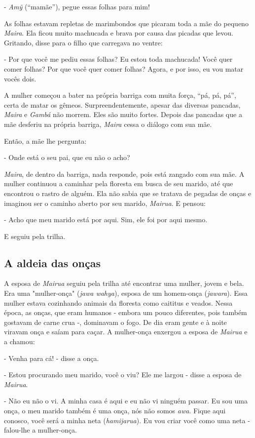 - \emph{Amỹ} (``mamãe''), pegue essas folhas para mim!

As folhas estavam repletas de marimbondos que picaram toda a mãe do
pequeno \emph{Maira}. Ela ficou muito machucada e brava por causa das
picadas que levou. Gritando, disse para o filho que carregava no ventre:

- Por que você me pediu essas folhas? Eu estou toda machucada! Você quer
comer folhas? Por que você quer comer folhas? Agora, e por isso, eu vou
matar vocês dois.

A mulher começou a bater na própria barriga com muita força, ``pá, pá,
pá'', certa de matar os gêmeos. Surpreendentemente, apesar das diversas
pancadas, \emph{Maira} e \emph{Gambá} não morrem. Eles são muito fortes.
Depois das pancadas que a mãe desferiu na própria barriga, \emph{Maira}
cessa o diálogo com sua mãe.

Então, a mãe lhe pergunta:

- Onde está o seu pai, que eu não o acho?

\emph{Maira}, de dentro da barriga, nada responde, pois está zangado com
sua mãe. A mulher continuou a caminhar pela floresta em busca de seu
marido, até que encontrou o rastro de alguém. Ela não sabia que se
tratava de pegadas de onças e imaginou ser o caminho aberto por seu
marido, \emph{Mairua}. E pensou:

- Acho que meu marido está por aqui. Sim, ele foi por aqui mesmo.

E seguiu pela trilha.

\subsection{A aldeia das onças}

A esposa de \emph{Mairua} seguiu pela trilha até encontrar uma mulher,
jovem e bela. Era uma "mulher-onça" (\emph{jawa wahya}), esposa de um
homem-onça (\emph{jawara}). Essa mulher estava cozinhando animais da
floresta como caititus e veados. Nessa época, as onças, que eram humanos
- embora um pouco diferentes, pois também gostavam de carne crua -,
dominavam o fogo. De dia eram gente e à noite viravam onça e saíam para
caçar. A mulher-onça enxergou a esposa de \emph{Mairua} e a chamou:

- Venha para cá! - disse a onça.

- Estou procurando meu marido, você o viu? Ele me largou - disse a
esposa de \emph{Mairua}.

- Não eu não o vi. A minha casa é aqui e eu não vi ninguém passar. Eu
sou uma onça, o meu marido também é uma onça, nós não somos \emph{awa}.
Fique aqui conosco, você será a minha neta (\emph{hamijarua}). Eu vou
criar você como uma neta - falou-lhe a mulher-onça.

